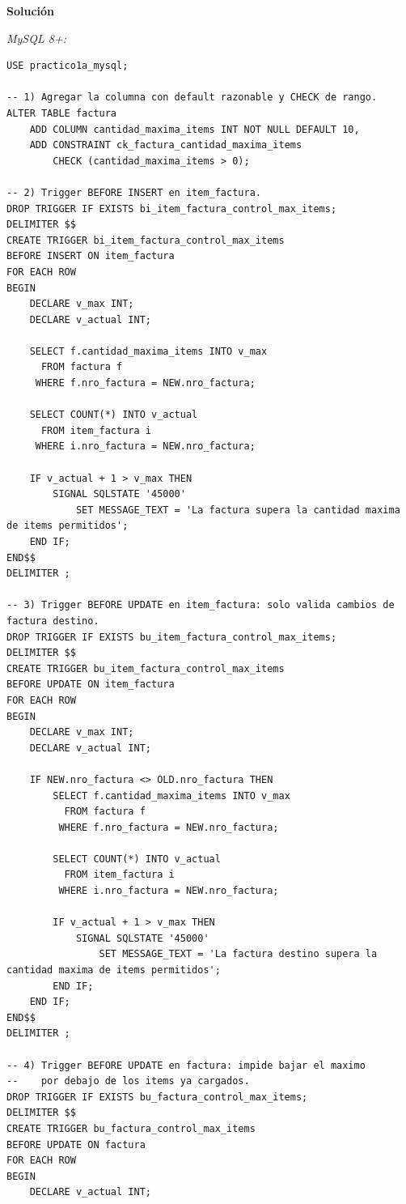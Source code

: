 \documentclass[11pt,a4paper]{article}
\newcommand{\itemcabecera}[1]{\noindent\textbf{#1}\par\medskip}
\newcommand{\bloqueSolucion}{\itemcabecera{Soluci\'on}}
\begin{document}
\bloqueSolucion

\textit{MySQL 8+:}

\begin{lstlisting}
USE practico1a_mysql;

-- 1) Agregar la columna con default razonable y CHECK de rango.
ALTER TABLE factura
    ADD COLUMN cantidad_maxima_items INT NOT NULL DEFAULT 10,
    ADD CONSTRAINT ck_factura_cantidad_maxima_items
        CHECK (cantidad_maxima_items > 0);

-- 2) Trigger BEFORE INSERT en item_factura.
DROP TRIGGER IF EXISTS bi_item_factura_control_max_items;
DELIMITER $$
CREATE TRIGGER bi_item_factura_control_max_items
BEFORE INSERT ON item_factura
FOR EACH ROW
BEGIN
    DECLARE v_max INT;
    DECLARE v_actual INT;

    SELECT f.cantidad_maxima_items INTO v_max
      FROM factura f
     WHERE f.nro_factura = NEW.nro_factura;

    SELECT COUNT(*) INTO v_actual
      FROM item_factura i
     WHERE i.nro_factura = NEW.nro_factura;

    IF v_actual + 1 > v_max THEN
        SIGNAL SQLSTATE '45000'
            SET MESSAGE_TEXT = 'La factura supera la cantidad maxima de items permitidos';
    END IF;
END$$
DELIMITER ;

-- 3) Trigger BEFORE UPDATE en item_factura: solo valida cambios de factura destino.
DROP TRIGGER IF EXISTS bu_item_factura_control_max_items;
DELIMITER $$
CREATE TRIGGER bu_item_factura_control_max_items
BEFORE UPDATE ON item_factura
FOR EACH ROW
BEGIN
    DECLARE v_max INT;
    DECLARE v_actual INT;

    IF NEW.nro_factura <> OLD.nro_factura THEN
        SELECT f.cantidad_maxima_items INTO v_max
          FROM factura f
         WHERE f.nro_factura = NEW.nro_factura;

        SELECT COUNT(*) INTO v_actual
          FROM item_factura i
         WHERE i.nro_factura = NEW.nro_factura;

        IF v_actual + 1 > v_max THEN
            SIGNAL SQLSTATE '45000'
                SET MESSAGE_TEXT = 'La factura destino supera la cantidad maxima de items permitidos';
        END IF;
    END IF;
END$$
DELIMITER ;

-- 4) Trigger BEFORE UPDATE en factura: impide bajar el maximo
--    por debajo de los items ya cargados.
DROP TRIGGER IF EXISTS bu_factura_control_max_items;
DELIMITER $$
CREATE TRIGGER bu_factura_control_max_items
BEFORE UPDATE ON factura
FOR EACH ROW
BEGIN
    DECLARE v_actual INT;


\end{lstlisting}
\end{document}
